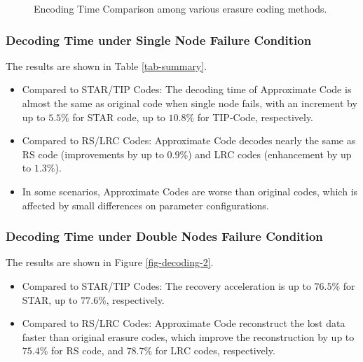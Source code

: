 \documentclass[sigconf]{acmart}
\begin{document}
\begin{figure}[ht]

\caption{Encoding Time Comparison among various erasure coding methods.}\label{fig-encoding}

\end{figure}


\subsubsection{Decoding Time under Single Node Failure Condition}
The results are shown in Table \ref{tab-summary}.
\begin{itemize}
    \item Compared to STAR/TIP Codes: The decoding time of Approximate Code is almost the same as original code when single node fails, with an increment by up to $5.5\%$ for STAR code, up to $10.8\%$ for TIP-Code, respectively.
    \item Compared to RS/LRC Codes: Approximate Code decodes nearly the same as RS code (improvements by up to $0.9\%$) and LRC codes (enhancement by up to $1.3\%$).
    \item In some scenarios, Approximate Codes are worse than original codes, which is affected by small differences on parameter configurations.
\end{itemize}


\subsubsection{Decoding Time under Double Nodes Failure Condition}
The results are shown in Figure \ref{fig-decoding-2}.
\begin{itemize}
    \item Compared to STAR/TIP Codes: The recovery acceleration is up to $76.5\%$ for STAR, up to $77.6\%$, respectively.
    \item Compared to RS/LRC Codes: Approximate Code reconstruct the lost data faster than original erasure codes, which improve the reconstruction by up to $75.4\%$ for RS code, and $78.7\%$ for LRC codes, respectively.
\end{itemize}
\end{document}
